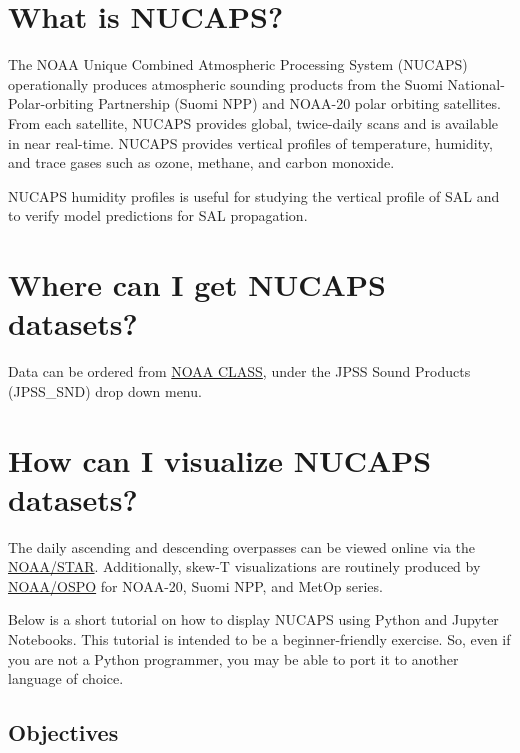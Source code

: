 \documentclass[11pt]{article}
\begin{document}
\section{What is NUCAPS?}\label{what-is-nucaps}

The NOAA Unique Combined Atmospheric Processing System (NUCAPS)
operationally produces atmospheric sounding products from the Suomi
National-Polar-orbiting Partnership (Suomi NPP) and NOAA-20 polar orbiting
satellites. From each satellite, NUCAPS provides global, twice-daily
scans and is available in near real-time. NUCAPS provides vertical profiles
of temperature, humidity, and trace gases such as ozone, methane, and
carbon monoxide.

NUCAPS humidity profiles is useful for studying the vertical profile of
SAL and to verify model predictions for SAL propagation.

\section{Where can I get NUCAPS
datasets?}\label{where-can-i-get-nucaps-datasets}

Data can be ordered from
\href{https://www.bou.class.noaa.gov/saa/products/search?sub_id=0\&datatype_family=JPSS_SND\&submit.x=24\&submit.y=7}{NOAA
CLASS}, under the JPSS Sound Products (JPSS\_SND) drop down menu.

\section{How can I visualize NUCAPS
datasets?}\label{how-can-i-visualize-nucaps-datasets}

The daily ascending and descending overpasses can be viewed online via
the
\href{https://www.star.nesdis.noaa.gov/jpss/EDRs/products_Soundings_N20.php}{NOAA/STAR}. Additionally, skew-T visualizations are routinely produced by \href{https://www.ospo.noaa.gov/Products/atmosphere/soundings/nucaps/pskewt/USACON.html}{NOAA/OSPO} for NOAA-20, Suomi NPP, and MetOp series.

Below is a short tutorial on how to display NUCAPS using Python and
Jupyter Notebooks. This tutorial is intended to be a beginner-friendly exercise. So, even if
you are not a Python programmer, you may be able to port it to another
language of choice.

\subsection{Objectives}\label{objectives}
\end{document}

